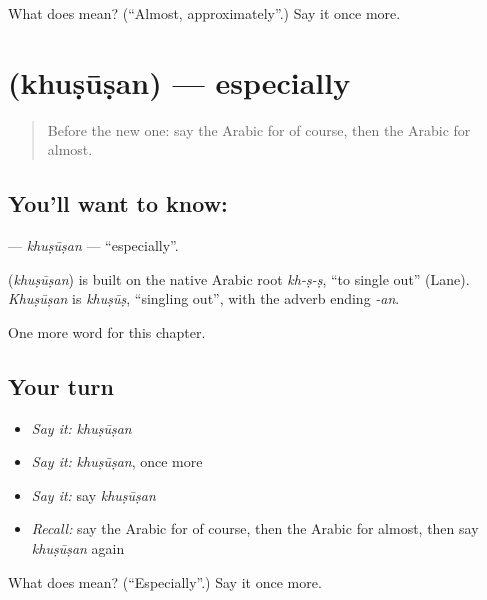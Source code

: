 \begin{tcolorbox}[breakable,colback=teal!4,colframe=teal!35!black,title={Before you move on}]
What does  mean? (\textquotedblleft{}Almost, approximately\textquotedblright{}.) Say it once more.
\end{tcolorbox}
\section[\texorpdfstring{\ar{خصوصا} (khuṣūṣan)}{خصوصا (khuṣūṣan)}]{ (khuṣūṣan) — especially}

\label{lesson:AR-C238-khususan}



\begin{quote}
Before the new one: say the Arabic for of course, then the Arabic for almost.
\end{quote}

\subsection*{You'll want to know: }
\textbf{} — \emph{khuṣūṣan} — \textquotedblleft{}especially\textquotedblright{}.

\begin{cousinweb}
\textbf{} (\emph{khuṣūṣan}) is built on the native Arabic root \emph{kh-ṣ-ṣ}, \textquotedblleft{}to single out\textquotedblright{} (Lane). \emph{Khuṣūṣan} is \emph{khuṣūṣ}, \textquotedblleft{}singling out\textquotedblright{}, with the adverb ending \emph{-an}.
\end{cousinweb}

\begin{grammarlens}[title={What you've built}]
One more word for this chapter.
\end{grammarlens}

\subsection*{Your turn}
\begin{itemize}
\raggedright
  \item \emph{Say it:} \emph{khuṣūṣan}
  \item \emph{Say it:} \emph{khuṣūṣan}, once more
  \item \emph{Say it:} say \emph{khuṣūṣan}
  \item \emph{Recall:} say the Arabic for of course, then the Arabic for almost, then say \emph{khuṣūṣan} again
\end{itemize}

\begin{tcolorbox}[breakable,colback=teal!4,colframe=teal!35!black,title={Before you move on}]
What does  mean? (\textquotedblleft{}Especially\textquotedblright{}.) Say it once more.
\end{tcolorbox}
